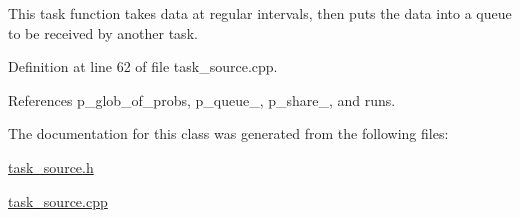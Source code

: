 This task function takes data at regular intervals, then puts the data into a queue to be received by another task. 

Definition at line 62 of file task\+\_\+source.\+cpp.



References p\+\_\+glob\+\_\+of\+\_\+probs, p\+\_\+queue\+\_, p\+\_\+share\+\_, and runs.



The documentation for this class was generated from the following files\+:\begin{DoxyCompactItemize}
\item 
\hyperlink{task__source_8h}{task\+\_\+source.\+h}\item 
\hyperlink{task__source_8cpp}{task\+\_\+source.\+cpp}\end{DoxyCompactItemize}
